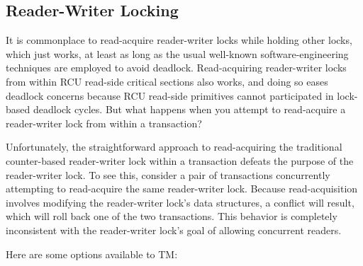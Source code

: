 \subsection{Reader-Writer Locking}
\label{sec:future:Reader-Writer Locking}

It is commonplace to read-acquire reader-writer locks while holding
other locks, which just works, at least as long as the usual well-known
software-engineering techniques are employed to avoid deadlock.
Read-acquiring reader-writer locks from within RCU read-side critical
sections also works, and doing so eases deadlock concerns because RCU
read-side primitives cannot participated in lock-based deadlock cycles.
But what happens when you attempt to read-acquire a reader-writer lock
from within a transaction?

Unfortunately, the straightforward approach to read-acquiring the
traditional counter-based reader-writer lock within a transaction defeats
the purpose of the reader-writer lock.
To see this, consider a pair of transactions concurrently attempting to
read-acquire the same reader-writer lock.
Because read-acquisition involves modifying the reader-writer lock's
data structures, a conflict will result, which will roll back one of
the two transactions.
This behavior is completely inconsistent with the reader-writer lock's
goal of allowing concurrent readers.

Here are some options available to TM:

